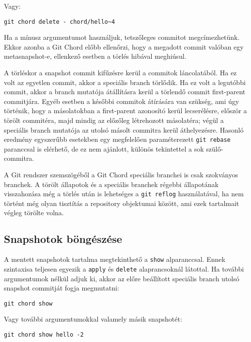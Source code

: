 \documentclass[final]{elteikthesis}[2025/03/25]
\begin{document}
Vagy:

\begin{verbatim}
git chord delete - chord/hello~4
\end{verbatim}

Ha a mínusz argumentumot használjuk, tetszőleges commitot megcímezhetünk.
Ekkor azonba a Git Chord előbb ellenőrzi,
hogy a megadott commit valóban egy metasnapshot-e,
ellenkező esetben a törlés hibával meghiúsul.

A törléskor a snapshot commit kifűzésre kerül a commitok láncolatából.
Ha ez volt az egyetlen commit, akkor a speciális branch törlődik.
Ha ez volt a legutóbbi commit, akkor a branch mutatója átállításra kerül
a törlendő commit first-parent commitjára.
Egyéb esetben a későbbi commitok átírására van szükség,
ami úgy történik, hogy a másolatokban a first-parent azonosító kerül lecserélésre,
először a törölt commitéra, majd mindig az előzőleg létrehozott másolatéra;
végül a speciális branch mutatója az utolsó másolt commitra kerül áthelyezésre.
Hasonló eredmény egyszerűbb esetekben egy megfelelően paraméterezett \verb|git rebase|
paranccsal is elérhető,
de ez nem ajánlott, különös tekintettel a sok szülő-commitra.

A Git rendszer szemszögéből a Git Chord speciális branchei is csak szokványos branchek.
A törölt állapotok és a speciális branchek régebbi állapotának visszahozása
még a törlés után is lehetséges a \verb|git reflog| használatával,
ha nem történt még olyan tisztítás a repository objektumai között,
ami ezek tartalmait végleg törölte volna.

\subsection{Snapshotok böngészése}

A mentett snapshotok tartalma megtekinthető a \verb|show| alparanccsal.
Ennek szintaxisa teljesen egyezik a \verb|apply| és \verb|delete| alaprancsoknál látottal.
Ha további argumentumok nélkül adjuk ki, akkor az előre beállított speciális branch
utolsó snapshot commitját fogja megmutatni:

\begin{verbatim}
git chord show
\end{verbatim}

Vagy további argumentumokkal valamely másik snapshotét:

\begin{verbatim}
git chord show hello -2
\end{verbatim}
\end{document}
